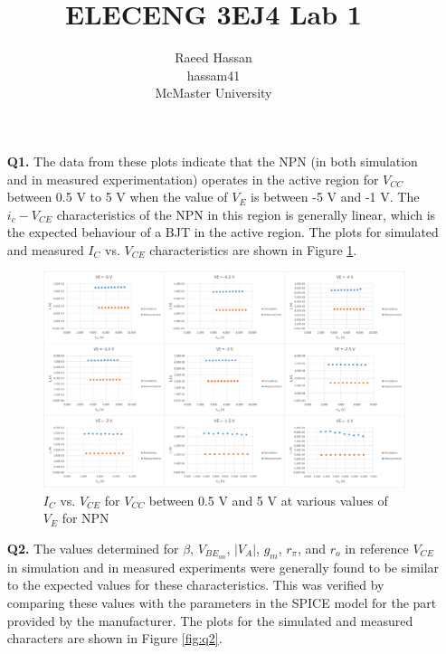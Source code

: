 \documentclass[12pt]{article}
\title{ELECENG 3EJ4 Lab 1}
\author{Raeed Hassan \\ hassam41 \\ McMaster University}
\begin{document}
\maketitle
\pagebreak
\begin{itemize}
    \section*{Part 1}
    \item [\textbf{Q1.}]
    The data from these plots indicate that the NPN (in both simulation and in measured experimentation) operates in the active region for $V_{CC}$ between 0.5 V to 5 V when the value of $V_E$ is between -5 V and -1 V. The $i_c-V_{CE}$ characteristics of the NPN in this region is generally linear, which is the expected behaviour of a BJT in the active region. The plots for simulated and measured $I_C$ vs. $V_{CE}$ characteristics are shown in Figure \ref{fig:q1}.
    \begin{figure}[ht]
        \centering
        \includegraphics[width=\textwidth]{Q1.png}
        \caption{$I_C$ vs. $V_{CE}$ for $V_{CC}$ between 0.5 V and 5 V at various values of $V_E$ for NPN}
        \label{fig:q1}
    \end{figure}
    \item [\textbf{Q2.}]
    The values determined for $\beta$, $V_{BE_{on}}$, $|V_A|$, $g_m$, $r_{\pi}$, and $r_o$ in reference $V_{CE}$ in simulation and in measured experiments were generally found to be similar to the expected values for these characteristics. This was verified by comparing these values with the parameters in the SPICE model for the part provided by the manufacturer. The plots for the simulated and measured characters are shown in Figure \ref{fig:q2}.
    \begin{figure}[ht]

\end{figure}
\end{itemize}
\end{document}
